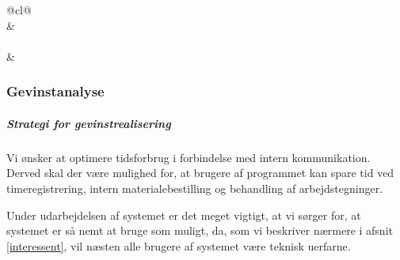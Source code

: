 \begin{table}[H]
{\begin{tabular}{@{}cl@{}}
                                                                                                                                                                                                                                                            \\ \midrule
{}                                                                                                &                                   \\ \midrule
{}                                                                                                                                                                               \\ \midrule
{} &  \\ \bottomrule
\end{tabular}
}
\end{table}

\subsubsection{Gevinstanalyse}
\subparagraph{Strategi for gevinstrealisering}
Vi ønsker at optimere tidsforbrug i forbindelse med intern kommunikation. Derved skal der være mulighed for, at brugere af programmet kan spare tid ved timeregistrering, intern materialebestilling og behandling af arbejdstegninger.

Under udarbejdelsen af systemet er det meget vigtigt, at vi sørger for, at systemet er så nemt at bruge som muligt, da, som vi beskriver nærmere i afsnit \ref{interessent}, vil næsten alle brugere af systemet være teknisk uerfarne.

